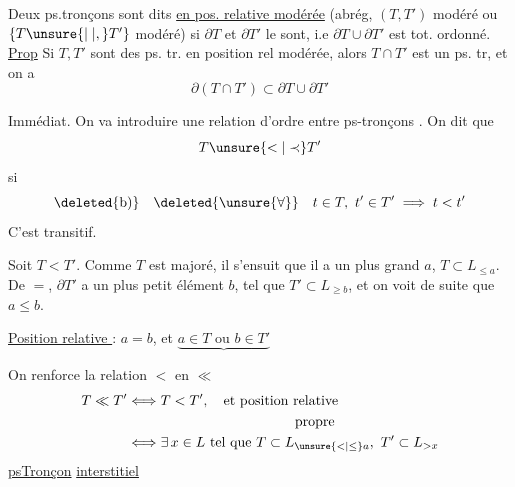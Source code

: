  Deux ps.tronçons  sont dits \uline{en pos. relative modérée} (abrég, $(T,T')$  modéré ou $\{T\unsure{\mid|,}T'\}$ modéré) si $\partial T$ et $\partial T'$ le sont, i.e $\partial T\cup\partial T'$ est tot. ordonné.
\noindent\llap{\rule[-1.05\baselineskip]{0.4pt}{1.85\baselineskip}\hspace{0.65em}}\uline{Prop} Si $T,T'$ sont des ps. tr. en position rel modérée, alors $T\cap T'$ est  un ps. tr, et on a
\[
\partial(T\cap T')\subset\partial T\cup\partial T'
\]

Immédiat. On va introduire une relation d'ordre entre ps-tronçons . On dit que
\[
T\unsure{<|\prec}T'
\]
si 
\[
\deleted{\text{b)}}\quad\deleted{\unsure{\forall}}\quad t\in T,\ t'\in T'\implies t<t'
\]
C'est  transitif.

Soit $T<T'$. Comme $T$ est majoré, il s'ensuit que  il a un plus grand   $a$,   $T\subset L_{\leq a}$.  De $=$, $\partial T'$ a un plus petit élément $b$, tel que $T'\subset L_{\geq b}$,   et on voit de suite que $a\leq b$.

\uline{Position relative  } : $a=b$, et $\underbrace{a\in T\text{ ou }b\in T'}$%


On renforce la relation $<$ en $\ll$
\[
\begin{aligned}
T\ll T' &\Longleftrightarrow T<T',\quad\text{et position relative}\\
&\hspace{12em}\text{propre}\\
&\Longleftrightarrow \exists\,x\in L\text{ tel que }T\subset L_{\unsure{<|\leq}a},\ T'\subset L_{>x}
\end{aligned}
\]
\uline{psTronçon} \uline{interstitiel}

